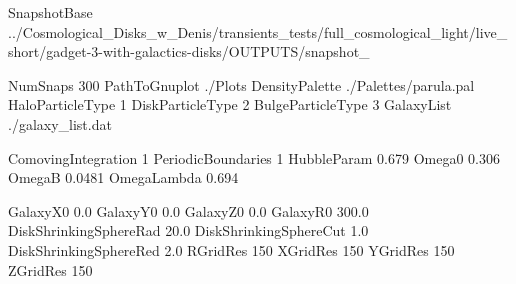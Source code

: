 %
%




SnapshotBase       ../Cosmological_Disks_w_Denis/transients_tests/full_cosmological_light/live_short/gadget-3-with-galactics-disks/OUTPUTS/snapshot_

NumSnaps           300
PathToGnuplot      ./Plots
DensityPalette     ./Palettes/parula.pal
HaloParticleType   1
DiskParticleType   2
BulgeParticleType  3
GalaxyList         ./galaxy_list.dat


ComovingIntegration    1
PeriodicBoundaries     1
HubbleParam            0.679
Omega0                 0.306
OmegaB                 0.0481
OmegaLambda            0.694


GalaxyX0                0.0
GalaxyY0                0.0
GalaxyZ0                0.0
GalaxyR0                300.0
DiskShrinkingSphereRad  20.0
DiskShrinkingSphereCut  1.0
DiskShrinkingSphereRed  2.0
RGridRes                150
XGridRes                150
YGridRes                150
ZGridRes                150

